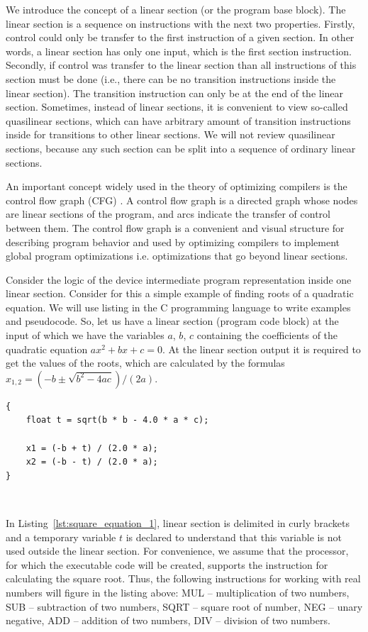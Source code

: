 \documentclass[
11pt,%
tightenlines,%
twoside,%
onecolumn,%
nofloats,%
nobibnotes,%
nofootinbib,%
superscriptaddress,%
noshowpacs,%
centertags]%
{revtex4}
\begin{document}
We introduce the concept of a linear section (or the program base block).
The linear section is a sequence on instructions with the next two properties.
Firstly, control could only be transfer to the first instruction of a given section.
In other words, a linear section has only one input, which is the first section instruction.
Secondly, if control was transfer to the linear section than all instructions of this section must be done (i.e., there can be no transition instructions inside the linear section).
The transition instruction can only be at the end of the linear section.
Sometimes, instead of linear sections, it is convenient to view so-called quasilinear sections, which can have arbitrary amount of transition instructions inside for transitions to other linear sections.
We will not review quasilinear sections, because any such section can be split into a sequence of ordinary linear sections.

An important concept widely used in the theory of optimizing compilers is the control flow graph (CFG) \cite{Muchnick}.
A control flow graph is a directed graph whose nodes are linear sections of the program, and arcs indicate the transfer of control between them.
The control flow graph is a convenient and visual structure for describing program behavior and used by optimizing compilers to implement global program optimizations i.e. optimizations that go beyond linear sections.

Consider the logic of the device intermediate program representation inside one linear section.
Consider for this a simple example of finding roots of a quadratic equation.
We will use listing in the C programming language to write examples and pseudocode.
So, let us have a linear section (program code block) at the input of which we have the variables $a$, $b$, $c$ containing the coefficients of the quadratic equation $ax^2 + bx + c = 0$.
At the linear section output it is required to get the values of the roots, which are calculated by the formulas $x_{1,2} = (-b \pm \sqrt{b^2 - 4ac})/(2a)$.

\begin{lstlisting}[caption={The code block for calculating the roots of the quadratic equation.},label={lst:square_equation_1}]
{
    float t = sqrt(b * b - 4.0 * a * c);
    
    x1 = (-b + t) / (2.0 * a);
    x2 = (-b - t) / (2.0 * a);
}
\end{lstlisting}

\

In Listing~\ref{lst:square_equation_1}, linear section is delimited in curly brackets and a temporary variable $t$ is declared to understand that this variable is not used outside the linear section.
For convenience, we assume that the processor, for which the executable code will be created, supports the instruction for calculating the square root.
Thus, the following instructions for working with real numbers will figure in the listing above: MUL -- multiplication of two numbers, SUB -- subtraction of two numbers, SQRT -- square root of number, NEG -- unary negative, ADD -- addition of two numbers, DIV -- division of two numbers.
\end{document}
